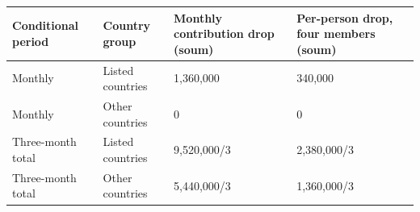 \begingroup\fontsize{11}{13.2}\selectfont
\begin{longtable}{p{} p{} p{} p{}}
\toprule
Conditional period & Country group & Monthly contribution drop (soum) & Per-person drop, four members (soum) \\
\midrule
\endhead
Monthly & Listed countries & 1,360,000 & 340,000 \\
Monthly & Other countries & 0 & 0 \\
Three-month total & Listed countries & 9,520,000/3 & 2,380,000/3 \\
Three-month total & Other countries & 5,440,000/3 & 1,360,000/3 \\
\bottomrule
\end{longtable}
\endgroup
